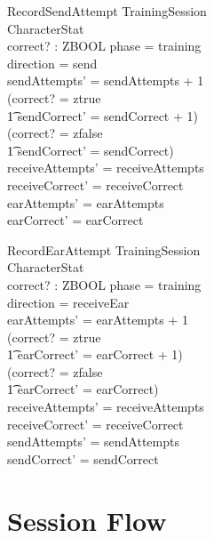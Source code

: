 \documentclass[a4paper,10pt,fleqn]{article}
\begin{document}
\begin{schema}{RecordSendAttempt}
  \Xi TrainingSession \\
  \Delta CharacterStat \\
  correct? : ZBOOL
  \where
  phase = training \\
  direction = send \\
  sendAttempts' = sendAttempts + 1 \\
  (correct? = ztrue \\
  \t1 \land sendCorrect' = sendCorrect + 1) \\
  \lor (correct? = zfalse \\
  \t1 \land sendCorrect' = sendCorrect) \\
  receiveAttempts' = receiveAttempts \\
  receiveCorrect' = receiveCorrect \\
  earAttempts' = earAttempts \\
  earCorrect' = earCorrect
\end{schema}

\begin{schema}{RecordEarAttempt}
  \Xi TrainingSession \\
  \Delta CharacterStat \\
  correct? : ZBOOL
  \where
  phase = training \\
  direction = receiveEar \\
  earAttempts' = earAttempts + 1 \\
  (correct? = ztrue \\
  \t1 \land earCorrect' = earCorrect + 1) \\
  \lor (correct? = zfalse \\
  \t1 \land earCorrect' = earCorrect) \\
  receiveAttempts' = receiveAttempts \\
  receiveCorrect' = receiveCorrect \\
  sendAttempts' = sendAttempts \\
  sendCorrect' = sendCorrect
\end{schema}

\section{Session Flow}
\end{document}
